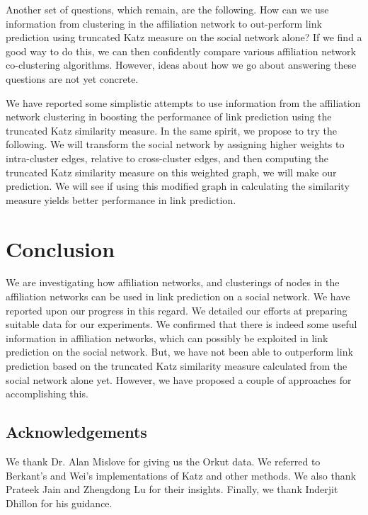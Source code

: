 \documentclass{report}
\begin{document}
Another set of questions, which remain, are the following. How can we use information from clustering in the affiliation network to out-perform link prediction using truncated Katz measure on the social network alone? If we find a good way to do this, we can then confidently compare various affiliation network co-clustering algorithms. However, ideas about how we go about answering these questions are not yet concrete.

We have reported some simplistic attempts to use information from the affiliation network clustering in boosting the performance of link prediction using the truncated Katz similarity measure. In the same spirit, we propose to try the following. We will transform the social network by assigning higher weights to intra-cluster edges, relative to cross-cluster edges, and then computing the truncated Katz similarity measure on this weighted graph, we will make our prediction. We will see if using this modified graph in calculating the similarity measure yields better performance in link prediction.

\chapter{Conclusion}
We are investigating how affiliation networks, and clusterings of nodes in the affiliation networks can be used in link prediction on a social network. We have reported upon our progress in this regard. We detailed our efforts at preparing suitable data for our experiments. We confirmed that there is indeed some useful information in affiliation networks, which can possibly be exploited in link prediction on the social network. But, we have not been able to outperform link prediction based on the truncated Katz similarity measure calculated from the social network alone yet. However, we have proposed a couple of approaches for accomplishing this.

\section{Acknowledgements}
We thank Dr. Alan Mislove \cite{mislove-2007-socialnetworks} for giving us the Orkut data. We referred to Berkant's and Wei's implementations of Katz and other methods. We also thank Prateek Jain and Zhengdong Lu for their insights. Finally, we thank Inderjit Dhillon for his guidance.



\end{document}
